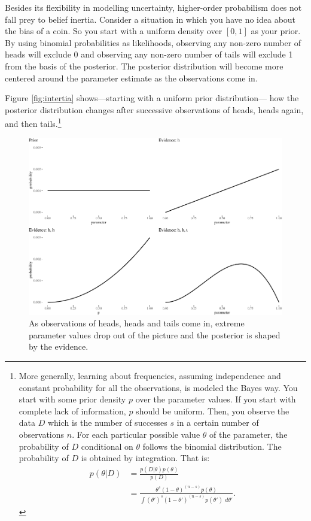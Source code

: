 \documentclass[
  10pt,
  dvipsnames,enabledeprecatedfontcommands]{scrartcl}
\begin{document}
Besides its flexibility in modelling uncertainty, higher-order
probabilism does not fall prey to belief inertia. Consider a situation
in which you have no idea about the bias of a coin. So you start with a
uniform density over \([0,1]\) as your prior. By using binomial
probabilities as likelihoods, observing any non-zero number of heads
will exclude 0 and observing any non-zero number of tails will exclude 1
from the basis of the posterior. The posterior distribution will become
more centered around the parameter estimate as the observations come in.

Figure \ref{fig:intertia} shows---starting with a uniform prior
distribution--- how the posterior distribution changes after successive
observations of heads, heads again, and then tails.\footnote{More
  generally, learning about frequencies, assuming independence and
  constant probability for all the observations, is modeled the Bayes
  way. You start with some prior density \(p\) over the parameter
  values. If you start with complete lack of information, \(p\) should
  be uniform. Then, you observe the data \(D\) which is the number of
  successes \(s\) in a certain number of observations \(n\). For each
  particular possible value \(\theta\) of the parameter, the probability
  of \(D\) conditional on \(\theta\) follows the binomial distribution.
  The probability of \(D\) is obtained by integration. That is:
  \begin{align*}
  p(\theta \vert D) & = \frac{p(D\vert \theta)p(\theta)}{p(D)}\\
  & = \frac{\theta^s (1-\theta)^{(n - s)}p(\theta)}{\int (\theta')^s (1-\theta')^{(n - s)}p(\theta')\,\, d\theta'}.
  \end{align*}}

\begin{figure}[t]

\begin{center}\includegraphics[width=0.8\linewidth]{imprecision_philosophical_paper._files/figure-latex/fig:inertia3-1} \end{center}
\caption{As observations of heads, heads and tails come in, extreme parameter values drop out of the picture and the posterior is shaped by the evidence.}
\label{fig:intertia2}
\end{figure}
\end{document}
